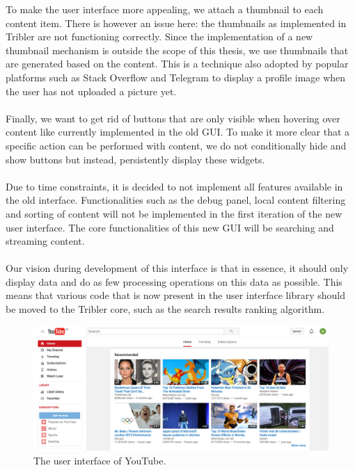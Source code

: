 To make the user interface more appealing, we attach a thumbnail to each content item. There is however an issue here: the thumbnails as implemented in Tribler are not functioning correctly. Since the implementation of a new thumbnail mechanism is outside the scope of this thesis, we use thumbnails that are generated based on the content. This is a technique also adopted by popular platforms such as Stack Overflow and Telegram to display a profile image when the user has not uploaded a picture yet.\\\\
Finally, we want to get rid of buttons that are only visible when hovering over content like currently implemented in the old GUI. To make it more clear that a specific action can be performed with content, we do not conditionally hide and show buttons but instead, persistently display these widgets.\\\\
Due to time constraints, it is decided to not implement all features available in the old interface. Functionalities such as the debug panel, local content filtering and sorting of content will not be implemented in the first iteration of the new user interface. The core functionalities of this new GUI will be searching and streaming content.\\\\
Our vision during development of this interface is that in essence, it should only display data and do as few processing operations on this data as possible. This means that various code that is now present in the user interface library should be moved to the Tribler core, such as the search results ranking algorithm.

\begin{figure}[t]
	\centering
	\includegraphics[width=1.0\columnwidth]{images/implementation/youtube_interface}
	\caption{The user interface of YouTube.}
	\label{fig:youtube-interface}
\end{figure}

